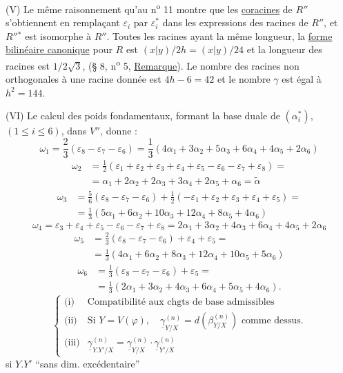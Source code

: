 (V) Le même raisonnement qu'au n\textsuperscript{o} 11 montre que les \uline{coracines} de $R''$ s'obtiennent en remplaçant $\varepsilon_i$ par $\varepsilon_i^*$ dans les expressions des racines de $R''$, et $R''{}^*$ est isomorphe à $R''$. Toutes les racines ayant la même longueur, la \uline{forme bilinéaire canonique} pour $R$ est $(x|y)/2h=(x|y)/24$ et la longueur des racines est $1/2\sqrt3$, (§ 8, n\textsuperscript{o} 5, \uline{Remarque}). Le nombre des racines non orthogonales à une racine donnée est $4h-6=42$ et le nombre $\gamma$ est égal à $h^2=144$.

(VI) Le calcul des poids fondamentaux, formant la base duale de $(\alpha_i^*)$, $(1\leq i\leq6)$, dans $V''$, donne :
\[
\omega_1=\frac23(\varepsilon_8-\varepsilon_7-\varepsilon_6)=\frac13(4\alpha_1+3\alpha_2+5\alpha_3+6\alpha_4+4\alpha_5+2\alpha_6)
\]
\[
\begin{aligned}
\omega_2&=\frac12(\varepsilon_1+\varepsilon_2+\varepsilon_3+\varepsilon_4+\varepsilon_5-\varepsilon_6-\varepsilon_7+\varepsilon_8)=\\
&=\alpha_1+2\alpha_2+2\alpha_3+3\alpha_4+2\alpha_5+\alpha_6=\widetilde\alpha
\end{aligned}
\]
\[
\begin{aligned}
\omega_3&=\frac56(\varepsilon_8-\varepsilon_7-\varepsilon_6)+\frac12(-\varepsilon_1+\varepsilon_2+\varepsilon_3+\varepsilon_4+\varepsilon_5)=\\
&=\frac13(5\alpha_1+6\alpha_2+10\alpha_3+12\alpha_4+8\alpha_5+4\alpha_6)
\end{aligned}
\]
\[
\omega_4=\varepsilon_3+\varepsilon_4+\varepsilon_5-\varepsilon_6-\varepsilon_7+\varepsilon_8=2\alpha_1+3\alpha_2+4\alpha_3+6\alpha_4+4\alpha_5+2\alpha_6
\]
\[
\begin{aligned}
\omega_5&=\frac23(\varepsilon_8-\varepsilon_7-\varepsilon_6)+\varepsilon_4+\varepsilon_5=\\
&=\frac13(4\alpha_1+6\alpha_2+8\alpha_3+12\alpha_4+10\alpha_5+5\alpha_6)
\end{aligned}
\]
\[
\begin{aligned}
\omega_6&=\frac13(\varepsilon_8-\varepsilon_7-\varepsilon_6)+\varepsilon_5=\\
&=\frac13(2\alpha_1+3\alpha_2+4\alpha_3+6\alpha_4+5\alpha_5+4\alpha_6).
\end{aligned}
\]
\[
\left\{\begin{array}{ll}
\text{(i)} & \text{Compatibilité aux chgts de base admissibles}\\[4pt]
\text{(ii)} & \text{Si }Y=V(\varphi),\quad \underline\gamma_{Y/X}^{(n)}=d(\beta_{Y/X}^{(n)})\text{ comme dessus.}\\[4pt]
\text{(iii)} & \underline\gamma_{Y.Y'/X}^{(n)}=\underline\gamma_{Y/X}^{(n)}\cdot\underline\gamma_{Y'/X}^{(n)}
\end{array}\right.
\]
si $Y.Y'$ ``sans dim. excédentaire''

